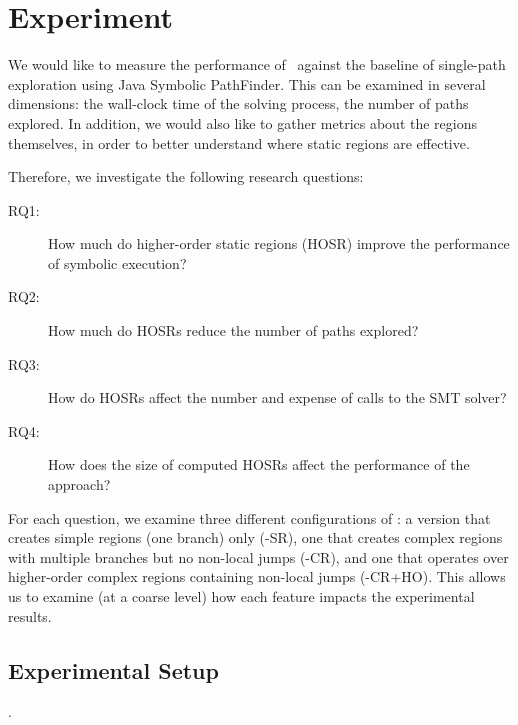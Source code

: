 \section{Experiment}

We would like to measure the performance of \tool\ against the baseline of single-path exploration using Java Symbolic
PathFinder.  This can be examined in several dimensions: the wall-clock time of the solving process, the number of paths
explored.  In addition, we would also like to gather metrics about the regions themselves, in order to better understand
where static regions are effective.

Therefore, we investigate the following research questions:

\begin{description}
\item[RQ1:] How much do higher-order static regions (HOSR) improve the performance of symbolic execution?
\item[RQ2:] How much do HOSRs reduce the number of paths explored?
\item[RQ3:] How do HOSRs affect the number and expense of calls to the SMT solver?
\item[RQ4:] How does the size of computed HOSRs affect the performance of the approach?
\end{description}

For each question, we examine three different configurations of \tool: a version that creates simple regions (one
branch) only (\tool-SR), one that creates complex regions with multiple branches but no non-local jumps (\tool-CR), and
one that operates over higher-order complex regions containing non-local jumps (\tool-CR+HO). This allows us to examine
(at a coarse level) how each feature impacts the experimental results.

\subsection{Experimental Setup}


. 